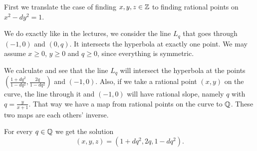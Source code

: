 \newcommand{\sheet}{9}




\maketitle

\begin{exercise}{1}
    First we translate the case of finding $x, y, z \in \mathbb{Z}$ to finding rational
    points on $x^2 - d y^2 = 1$.

    We do exactly like in the lectures, we consider the line $L_q$ that goes
    through $(-1, 0)$ and $(0, q)$. It intersects the hyperbola at exactly one
    point. We may assume $x \geq 0$, $y \geq 0$ and $q \geq 0$, since everything
    is symmetric.

    We calculate and see that the line $L_q$ will intersect the hyperbola at the
    points $\left( \frac{1+dq^2}{1-dq^2}, \frac{2q}{1-dq^2} \right)$ and $(-1,
    0)$. Also, if we take a rational point $(x, y)$ on the curve, the line
    through it and $(-1, 0)$ will have rational slope, namely $q$ with $q =
    \frac{y}{x+1}$. That way we have a map from rational points on the curve to
    $\mathbb{Q}$. These two maps are each others' inverse.

    For every $q \in \mathbb{Q}$ we get the solution
    \begin{equation*}
        (x, y, z) = (1 + dq^2, 2q, 1 - dq^2).
    \end{equation*}
\end{exercise}


